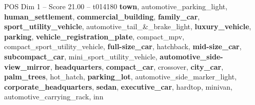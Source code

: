 \begin{textsample}{POS Dim 1 – Score 21.00 – t014180}  \label{ex:f1_pos_014}
\textbf{town}, automotive\_parking\_light, \textbf{human\_settlement}, \textbf{commercial\_building}, \textbf{family\_car}, \textbf{sport\_utility\_vehicle}, automotive\_tail\_\&\_brake\_light, \textbf{luxury\_vehicle}, \textbf{parking}, \textbf{vehicle\_registration\_plate}, compact\_mpv, compact\_sport\_utility\_vehicle, \textbf{full-size\_car}, hatchback, \textbf{mid-size\_car}, \textbf{subcompact\_car}, mini\_sport\_utility\_vehicle, \textbf{automotive\_side-view\_mirror}, \textbf{headquarters}, \textbf{compact\_car}, crossover, \textbf{city\_car}, \textbf{palm\_trees}, hot\_hatch, \textbf{parking\_lot}, automotive\_side\_marker\_light, \textbf{corporate\_headquarters}, \textbf{sedan}, \textbf{executive\_car}, hardtop, minivan, automotive\_carrying\_rack, inn

\end{textsample}
